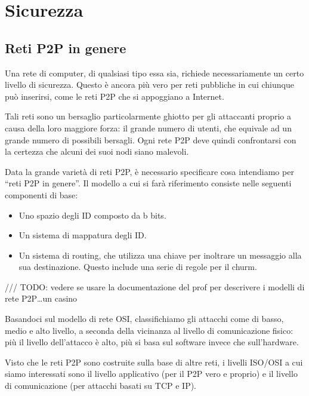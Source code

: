 \chapter{Sicurezza}\label{sicurezza}

\section{Reti P2P in genere}\label{reti-p2p-in-genere}

Una rete di computer, di qualsiasi tipo essa sia, richiede
necessariamente un certo livello di sicurezza. Questo è ancora più vero
per reti pubbliche in cui chiunque può inserirsi, come le reti P2P che
si appoggiano a Internet.

Tali reti sono un bersaglio particolarmente ghiotto per gli attaccanti
proprio a causa della loro maggiore forza: il grande numero di utenti,
che equivale ad un grande numero di possibili bersagli. Ogni rete P2P
deve quindi confrontarsi con la certezza che alcuni dei suoi nodi siano
malevoli.

Data la grande varietà di reti P2P, è necessario specificare cosa
intendiamo per ``reti P2P in genere''. Il modello \cite{vulenrabilities}
a cui si farà riferimento consiste nelle seguenti componenti di base:

\begin{itemize}
\itemsep1pt\parskip0pt
\item
  Uno spazio degli ID composto da b bits.
\item
  Un sistema di mappatura degli ID.
\item
  Un sistema di routing, che utilizza una chiave per inoltrare un
  messaggio alla sua destinazione. Questo include una serie di regole
  per il churm.
\end{itemize}

/// TODO: vedere se usare la documentazione del prof per descrivere i
modelli di rete P2P\ldots{}un casino

Basandoci sul modello di rete OSI, classifichiamo gli attacchi come di
basso, medio e alto livello, a seconda della vicinanza al livello di
comunicazione fisico: più il livello dell'attacco è alto, più si basa
sul software invece che sull'hardware.

Visto che le reti P2P sono costruite sulla base di altre reti, i livelli
ISO/OSI a cui siamo interessati sono il livello applicativo (per il P2P
vero e proprio) e il livello di comunicazione (per attacchi basati su
TCP e IP).

